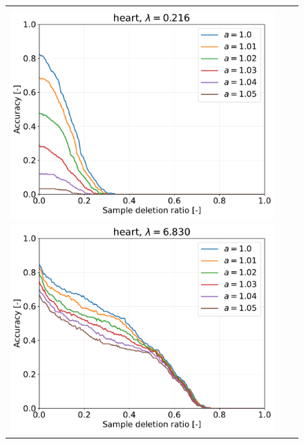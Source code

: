 \begin{figure}[H]
\begin{tabular}{ccc}
		\begin{minipage}[b]{0.3\hsize}\centering {\small Dataset: heart, $\lambda=n \cdot 10^{-3}$}\\\includegraphics[width=0.8\hsize]{fig/table_logistic/heart-logistic/kernel/kernel_ss_screening_rate_lam0.216_x_n_y_etest.pdf}\end{minipage}
		&
		\begin{minipage}[b]{0.3\hsize}\centering {\small Dataset: heart, $\lambda=n \cdot 10^{-1.5}$}\\\includegraphics[width=0.8\hsize]{fig/table_logistic/heart-logistic/kernel/kernel_ss_screening_rate_lam6.830_x_n_y_etest.pdf}\end{minipage}
		&

\end{tabular}
\end{figure}
